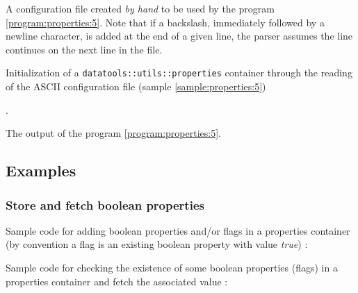 \begin{sample}[h]
\caption{A configuration file created \emph{by hand} to be used by the
  program  \ref{program:properties:5}.   Note   that  if  a  backslash, 
  immediately followed by  a newline character, is added
  at the end  of a given line,  the parser assumes the line continues
  on the next line in the file.}
\label{sample:properties:5}
\end{sample}

\begin{program}[h]
\caption{Initialization   of  a  \texttt{datatools::utils::properties}
  container  through  the  reading  of the  ASCII  configuration  file
  (sample \ref{sample:properties:5})}.
\label{program:properties:5}
\end{program}

\begin{sample}[h]
\caption{The output of the program \ref{program:properties:5}.}
\label{sample:properties:5out}
\end{sample}

\clearpage
\subsection{Examples}

\subsubsection{Store and fetch boolean properties}

\pn  Sample code  for  adding  boolean properties  and/or  flags in  a
properties  container (by  convention a  flag is  an  existing boolean
property with value \emph{true}) :

\pn
{}

\pn Sample code for checking  the existence of some boolean properties
(flags) in a properties container and fetch the associated value :

